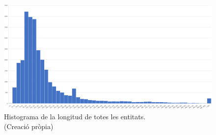 \begin{figure}[H]
  \centering
  \includegraphics[width=\textwidth]{hist_ent_tot.png}
  \caption[Histograma de la longitud de totes les entitats]{Histograma de la longitud de totes les entitats. \\ (Creació pròpia)}
  \label{fig:histograma_entitats_total}
\end{figure}